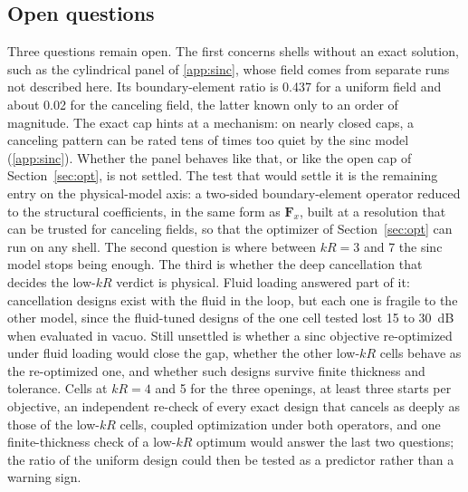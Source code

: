 \documentclass[preprint,12pt]{elsarticle}
\begin{document}
\subsection{Open questions}
Three questions remain open. The first concerns shells without an exact solution, such as the cylindrical panel of \ref{app:sinc}, whose field comes from separate runs not described here. Its boundary-element ratio is 0.437 for a uniform field and about 0.02 for the canceling field, the latter known only to an order of magnitude. %
The exact cap hints at a mechanism: on nearly closed caps, a canceling pattern can be rated tens of times too quiet by the sinc model (\ref{app:sinc}). Whether the panel behaves like that, or like the open cap of Section~\ref{sec:opt}, is not settled. The test that would settle it is the remaining entry on the physical-model axis: a two-sided boundary-element operator reduced to the structural coefficients, in the same form as $\mathbf F_x$, built at a resolution that can be trusted for canceling fields, so that the optimizer of Section~\ref{sec:opt} can run on any shell. The second question is where between $kR=3$ and 7 the sinc model stops being enough. The third is whether the deep cancellation that decides the low-$kR$ verdict is physical. Fluid loading answered part of it: cancellation designs exist with the fluid in the loop, but each one is fragile to the other model, since the fluid-tuned designs of the one cell tested lost 15 to 30~dB when evaluated in vacuo. Still unsettled is whether a sinc objective re-optimized under fluid loading would close the gap, whether the other low-$kR$ cells behave as the re-optimized one, and whether such designs survive finite thickness and tolerance. Cells at $kR=4$ and 5 for the three openings, at least three starts per objective, an independent re-check of every exact design that cancels as deeply as those of the low-$kR$ cells, coupled optimization under both operators, and one finite-thickness check of a low-$kR$ optimum would answer the last two questions; the ratio of the uniform design could then be tested as a predictor rather than a warning sign.

\end{document}
